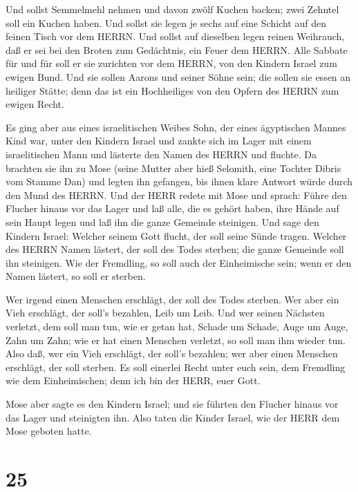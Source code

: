  Und sollst Semmelmehl nehmen und davon zwölf Kuchen backen;
zwei Zehntel soll ein Kuchen haben.  Und sollst sie legen je
sechs auf eine Schicht auf den feinen Tisch vor dem HERRN. 
Und sollst auf dieselben legen reinen Weihrauch, daß er sei bei den
Broten zum Gedächtnis, ein Feuer dem HERRN.  Alle Sabbate
für und für soll er sie zurichten vor dem HERRN, von den Kindern Israel
zum ewigen Bund.  Und sie sollen Aarons und seiner Söhne
sein; die sollen sie essen an heiliger Stätte; denn das ist ein
Hochheiliges von den Opfern des HERRN zum ewigen Recht.

 Es ging aber aus eines israelitischen Weibes Sohn, der
eines ägyptischen Mannes Kind war, unter den Kindern Israel und zankte
sich im Lager mit einem israelitischen Mann  und lästerte
den Namen des HERRN und fluchte. Da brachten sie ihn zu Mose (seine
Mutter aber hieß Selomith, eine Tochter Dibris vom Stamme Dan)
 und legten ihn gefangen, bis ihnen klare Antwort würde
durch den Mund des HERRN.  Und der HERR redete mit Mose und
sprach:  Führe den Flucher hinaus vor das Lager und laß
alle, die es gehört haben, ihre Hände auf sein Haupt legen und laß ihn
die ganze Gemeinde steinigen.  Und sage den Kindern Israel:
Welcher seinem Gott flucht, der soll seine Sünde tragen. 
Welcher des HERRN Namen lästert, der soll des Todes sterben; die ganze
Gemeinde soll ihn steinigen. Wie der Fremdling, so soll auch der
Einheimische sein; wenn er den Namen lästert, so soll er sterben.

 Wer irgend einen Menschen erschlägt, der soll des Todes
sterben.  Wer aber ein Vieh erschlägt, der soll's bezahlen,
Leib um Leib.  Und wer seinen Nächsten verletzt, dem soll
man tun, wie er getan hat,  Schade um Schade, Auge um Auge,
Zahn um Zahn; wie er hat einen Menschen verletzt, so soll man ihm wieder
tun.  Also daß, wer ein Vieh erschlägt, der soll's
bezahlen; wer aber einen Menschen erschlägt, der soll sterben.
 Es soll einerlei Recht unter euch sein, dem Fremdling wie
dem Einheimischen; denn ich bin der HERR, euer Gott.

 Mose aber sagte es den Kindern Israel; und sie führten den
Flucher hinaus vor das Lager und steinigten ihn. Also taten die Kinder
Israel, wie der HERR dem Mose geboten hatte.

\hypertarget{section-24}{%
\section{25}\label{section-24}}

